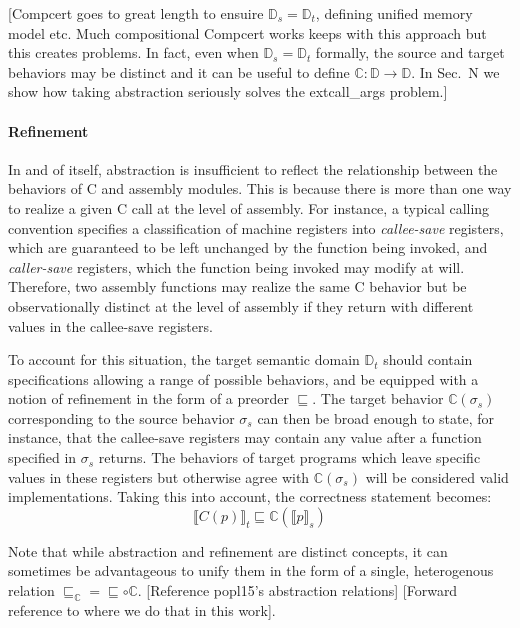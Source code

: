 \documentclass[sigplan,10pt,review,anonymous]{acmart}
\begin{document}
[Compcert goes to great length to ensuire $\mathbb{D}_s = \mathbb{D}_t$,
defining unified memory model etc.
Much compositional Compcert works keeps with this approach
but this creates problems.
In fact, even when $\mathbb{D}_s = \mathbb{D}_t$ formally,
the source and target behaviors may be distinct
and it can be useful to define
$\mathbb{C} : \mathbb{D} \rightarrow \mathbb{D}$.
In Sec.~N we show how taking abstraction seriously
solves the extcall\_args problem.]

\paragraph{Refinement}

In and of itself,
abstraction is insufficient to reflect
the relationship between the behaviors of C and assembly modules.
This is because there is more than one way to realize
a given C call at the level of assembly.
For instance,
a typical calling convention specifies a classification of machine registers
into \emph{callee-save} registers,
which are guaranteed to be left unchanged by the function being invoked,
and \emph{caller-save} registers,
which the function being invoked may modify at will.
Therefore,
two assembly functions may realize the same C behavior
but be observationally distinct at the level of assembly
if they return with different values in the callee-save registers.

To account for this situation,
the target semantic domain $\mathbb{D}_t$
should contain specifications
allowing a range of possible behaviors,
and be equipped with a notion of refinement
in the form of a preorder $\sqsubseteq$.
The target behavior $\mathbb{C}(\sigma_s)$
corresponding to the source behavior $\sigma_s$
can then be broad enough to state,
for instance,
that the callee-save registers
may contain any value after a function
specified in $\sigma_s$ returns.
The behaviors of target programs
which leave specific values in these registers
but otherwise agree with $\mathbb{C}(\sigma_s)$
will be considered valid implementations.
Taking this into account,
the correctness statement becomes:
\[ \llbracket C(p) \rrbracket_t \sqsubseteq
    \mathbb{C}(\llbracket p \rrbracket_s) \]

Note that while abstraction and refinement are distinct concepts,
it can sometimes be advantageous to unify them
in the form of a single, heterogenous relation
$\sqsubseteq_\mathbb{C} = \sqsubseteq \circ \mathbb{C}$.
[Reference popl15's abstraction relations]
[Forward reference to where we do that in this work].
\end{document}
